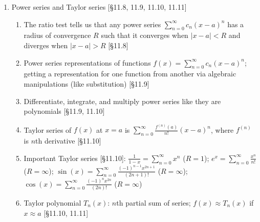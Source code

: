 \documentclass[11pt]{article}
\begin{document}
\begin{enumerate}
\item Power series and Taylor series [\S11.8, 11.9, 11.10, 11.11]
\begin{enumerate}
\item The ratio test tells us that any power series $\sum_{n=0}^{\infty} c_n (x-a)^n$ has a radius of convergence $R$ such that it converges when $|x-a|<R$ and diverges when $|x-a|>R$ [\S11.8]
\item Power series representations of functions $f(x) = \sum_{n=0}^{\infty} c_n (x-a)^n$; getting a representation for one function from another via algebraic manipulations (like substitution) [\S11.9]
\item Differentiate, integrate, and multiply power series like they are polynomials [\S11.9, 11.10]
\item Taylor series of $f(x)$ at $x=a$ is $\sum_{n=0}^{\infty} \frac{f^{(n)}(a)}{n!} (x-a)^n$, where $f^{(n)}$ is $n$th derivative [\S11.10]
\item Important Taylor series [\S11.10]: $\frac{1}{1-x} = \sum_{n=0}^{\infty} x^n$ ($R=1$); \; $e^x = \sum_{n=0}^{\infty} \frac{x^n}{n!}$ ($R=\infty$); \; $\sin(x) = \sum_{n=0}^{\infty} \frac{(-1)^{n-1}x^{2n+1}}{(2n+1)!}$ ($R=\infty$); \; $\cos(x)=\sum_{n=0}^{\infty}\frac{(-1)^{n}x^{2n}}{(2n)!}$ ($R=\infty$)
\item Taylor polynomial $T_n(x)$: $n$th partial sum of series; $f(x) \approx T_n(x)$ if $x\approx a$ [\S11.10, 11.11]
\end{enumerate}

\end{enumerate}
\end{document}

